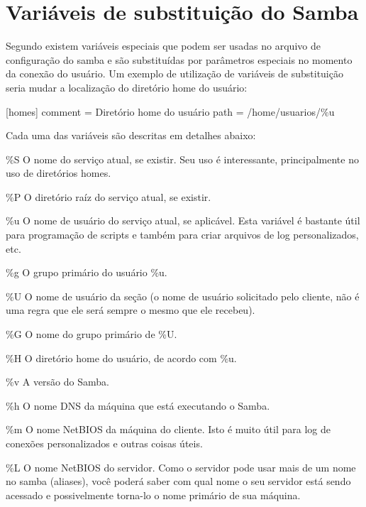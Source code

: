 

\section{Variáveis de substituição do Samba}

Segundo \cite{FOCA}  existem variáveis especiais que podem ser usadas no arquivo de configuração do samba e são substituídas por parâmetros especiais no momento da conexão do usuário. Um exemplo de utilização de variáveis de substituição seria mudar a localização do diretório home do usuário:

     [homes]
      comment = Diretório home do usuário
      path = /home/usuarios/\%u

Cada uma das variáveis são descritas em detalhes abaixo:

\%S
O nome do serviço atual, se existir. Seu uso é interessante, principalmente no uso de diretórios homes.

\%P
O diretório raíz do serviço atual, se existir.

\%u
O nome de usuário do serviço atual, se aplicável. Esta variável é bastante útil para programação de scripts e também para criar arquivos de log personalizados, etc.

\%g
O grupo primário do usuário \%u.

\%U
O nome de usuário da seção (o nome de usuário solicitado pelo cliente, não é uma regra que ele será sempre o mesmo que ele recebeu).

\%G
O nome do grupo primário de \%U.

\%H
O diretório home do usuário, de acordo com \%u.

\%v
A versão do Samba.

\%h
O nome DNS da máquina que está executando o Samba.

\%m
O nome NetBIOS da máquina do cliente. Isto é muito útil para log de conexões personalizados e outras coisas úteis.

\%L
O nome NetBIOS do servidor. Como o servidor pode usar mais de um nome no samba (aliases), você poderá saber com qual nome o seu servidor está sendo acessado e possivelmente torna-lo o nome primário de sua máquina.

